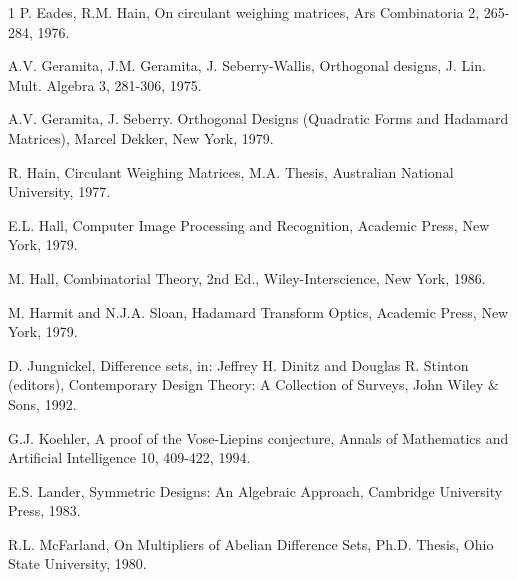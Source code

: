 {{\begin{thebibliography}{1}
    P. Eades, R.M. Hain, On circulant weighing matrices, Ars Combinatoria 2, 
    265-284, 1976.
  

    A.V. Geramita, J.M. Geramita, J. Seberry-Wallis, Orthogonal designs, 
    J. Lin. Mult. Algebra 3, 281-306, 1975.

    A.V. Geramita, J. Seberry. Orthogonal Designs (Quadratic Forms and
    Hadamard Matrices), Marcel Dekker, New York, 1979.

    R. Hain, Circulant Weighing Matrices, M.A. Thesis, Australian 
    National University, 1977.

    E.L. Hall, Computer Image Processing and Recognition, Academic Press, 
    New York, 1979.

    M. Hall, Combinatorial Theory, 2nd Ed., Wiley-Interscience, New York, 1986.

    M. Harmit and N.J.A. Sloan, Hadamard Transform Optics, Academic Press, 
    New York, 1979.

    D. Jungnickel, Difference sets, in: Jeffrey H. Dinitz and Douglas R. Stinton (editors),  
    Contemporary Design Theory: A Collection 
    of Surveys, John Wiley $\&$ Sons, 1992.

    G.J. Koehler, A proof of the Vose-Liepins conjecture, Annals of Mathematics 
    and Artificial Intelligence 10, 409-422, 1994.


  
  
    E.S. Lander, Symmetric Designs: An Algebraic Approach, Cambridge University 
    Press, 1983.
  

    R.L. McFarland, On Multipliers of Abelian Difference Sets, 
    Ph.D. Thesis, Ohio State University, 1980.



\end{thebibliography}}}
